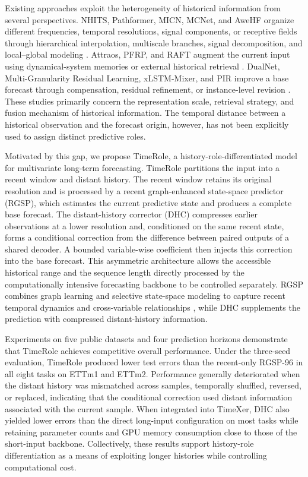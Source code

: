 Existing approaches exploit the heterogeneity of historical information from several perspectives. NHITS, Pathformer, MICN, MCNet, and AweHF organize different frequencies, temporal resolutions, signal components, or receptive fields through hierarchical interpolation, multiscale branches, signal decomposition, and local--global modeling \citep{Challu2023NHITS,Chen2024Pathformer,Wang2023MICN,Sun2024MCNet,Gong2026AweHF}. Attraos, PFRP, and RAFT augment the current input using dynamical-system memories or external historical retrieval \citep{Hu2024Attraos,Du2026PFRP,Han2025RAFT}. DualNet, Multi-Granularity Residual Learning, xLSTM-Mixer, and PIR improve a base forecast through compensation, residual refinement, or instance-level revision \citep{Li2025DualNet,Hou2022MRLF,Kraus2025xLSTMMixer,Liu2025PIR}. These studies primarily concern the representation scale, retrieval strategy, and fusion mechanism of historical information. The temporal distance between a historical observation and the forecast origin, however, has not been explicitly used to assign distinct predictive roles.

Motivated by this gap, we propose TimeRole, a history-role-differentiated model for multivariate long-term forecasting. TimeRole partitions the input into a recent window and distant history. The recent window retains its original resolution and is processed by a recent graph-enhanced state-space predictor (RGSP), which estimates the current predictive state and produces a complete base forecast. The distant-history corrector (DHC) compresses earlier observations at a lower resolution and, conditioned on the same recent state, forms a conditional correction from the difference between paired outputs of a shared decoder. A bounded variable-wise coefficient then injects this correction into the base forecast. This asymmetric architecture allows the accessible historical range and the sequence length directly processed by the computationally intensive forecasting backbone to be controlled separately. RGSP combines graph learning and selective state-space modeling to capture recent temporal dynamics and cross-variable relationships \citep{Huang2023CrossGNN,Wang2025SMamba,Karadag2026msMamba,Chen2026GMamba,Zhou2026SSMGNN}, while DHC supplements the prediction with compressed distant-history information.

Experiments on five public datasets and four prediction horizons demonstrate that TimeRole achieves competitive overall performance. Under the three-seed evaluation, TimeRole produced lower test errors than the recent-only RGSP-96 in all eight tasks on ETTm1 and ETTm2. Performance generally deteriorated when the distant history was mismatched across samples, temporally shuffled, reversed, or replaced, indicating that the conditional correction used distant information associated with the current sample. When integrated into TimeXer, DHC also yielded lower errors than the direct long-input configuration on most tasks while retaining parameter counts and GPU memory consumption close to those of the short-input backbone. Collectively, these results support history-role differentiation as a means of exploiting longer histories while controlling computational cost.

